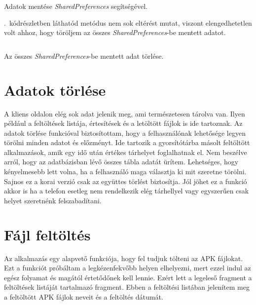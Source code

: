 \documentclass{thesis-ekf}
\theoremstyle{definition}
\theoremstyle{remark}
\begin{document}
\begin{listing}[ht]
	\inputminted[linenos=true, breaklines]{java}{./codes/saving_sharedpref.java}
	\caption{Adatok mentése \emph{SharedPreferences} segítségével.}
	\label{saving_sharedpref}
\end{listing}

.~kódrészletben láthatód metódus nem sok eltérést mutat, viszont elengedhetetlen volt ahhoz, hogy töröljem az összes \emph{SharedPreferences}-be mentett adatot.

\begin{listing}[ht]
	\inputminted[linenos=true, breaklines]{java}{./codes/deleting_sharedprefs.java}
	\caption{Az összes \emph{SharedPreferences}-be mentett adat törlése.}
	\label{deleting_sharedpref}
\end{listing}

\section{Adatok törlése}

A kliens oldalon elég sok adat jelenik meg, ami természetesen tárolva van.
Ilyen például a feltöltések listája, értesítések és a letöltött fájlok is ide tartoznak.
Az adatok törlése funkcióval biztosítottam, hogy a felhasználónak lehetősége legyen törölni minden adatot és előzményt.
Ide tartozik a gyorsítótárba másolt feltöltött alkalmazások, amik egy idő után értékes tárhelyet foglalhatnak el.
Nem beszélve arról, hogy az adatbázisban lévő összes tábla adatát ürítem.
Lehetséges, hogy kényelmesebb lett volna, ha a felhasználó maga választja ki mit szeretne törölni.
Sajnos ez a korai verzió csak az együttes törlést biztosítja.
Jól jöhet ez a funkció akkor is ha a telefon esetleg nem rendelkezik elég tárhellyel vagy egyszerűen csak helyet szeretnénk felszabadítani.

\section{Fájl feltöltés}

Az alkalmazás egy alapvető funkciója, hogy fel tudjuk tölteni az APK fájlokat.
Ezt a funkciót próbáltam a legkézenfekvőbb helyen elhelyezni, mert ezzel indul az egész folyamat és magától értetődőnek kell lennie.
Ezért lett a legeleső fragment a feltöltések listáját tartalmazó fragment.
Ebben a feltöltési listában jelenítem meg a feltöltött APK fájlok neveit és a feltöltés dátumát.
\end{document}
